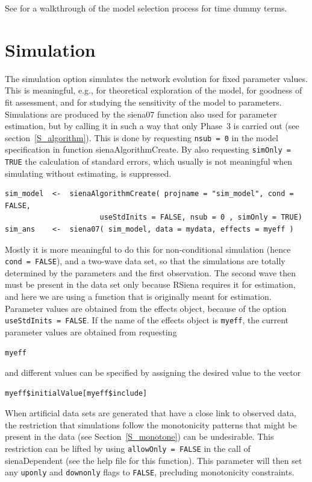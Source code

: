 \documentclass[a4paper,fleqn,11pt]{article}
\newcommand{\+}{\, + \,}
\newcommand{\sfn}[1]{\textsf{#1}}
\newcommand{\RS}{{\sf RSiena }}
\begin{document}
See \citet{Lospinoso2010b} for a walkthrough of the model selection process
for time dummy terms.


\newpage
\section{Simulation}
\label{S_sim}

The simulation option simulates the network evolution for fixed
parameter values. This is meaningful, e.g., for theoretical
exploration of the model, for goodness of fit assessment,
and for studying the sensitivity of the model to parameters.
Simulations are produced by the \textsf{siena07} function
also used for parameter estimation, but by calling it in
such a way that only Phase~3 is carried out
(see section~\ref{S_algorithm}).
This is done by requesting \texttt{nsub = 0} in
the model specification in function \textsf{sienaAlgorithmCreate}.
By also requesting \texttt{simOnly = TRUE} the calculation
of standard errors, which usually is not meaningful when
simulating without estimating, is suppressed.
\begin{verbatim}
sim_model  <-  sienaAlgorithmCreate( projname = "sim_model", cond = FALSE,
                      useStdInits = FALSE, nsub = 0 , simOnly = TRUE)
sim_ans    <-  siena07( sim_model, data = mydata, effects = myeff )
\end{verbatim}
Mostly it is more meaningful to do this for non-conditional simulation
(hence \texttt{cond = FALSE}), and a two-wave data set,
so that the simulations are totally determined
by the parameters and the first observation.
The second wave then must be present in the data set only
because \RS requires it for estimation,
and here we are using a function that is originally
meant for estimation.
Parameter values are obtained from the effects object,
because of the option \texttt{useStdInits = FALSE}.
If the name of the effects object is \texttt{myeff},
the current parameter values are obtained from requesting
\begin{verbatim}
myeff
\end{verbatim}
and different values can be specified by assigning the
desired value to the vector
\begin{verbatim}
myeff$initialValue[myeff$include]
\end{verbatim}

When artificial data sets are generated that have a close link to observed data,
the restriction that simulations follow the monotonicity patterns that
might be present in the data (see Section~\ref{S_monotone}) can be undesirable.
This restriction can be lifted by using \texttt{allowOnly = FALSE}
in the call of \sfn{sienaDependent} (see the help file for this function).
This parameter will then set any \texttt{uponly} and \texttt{downonly}
flags to \texttt{FALSE}, precluding monotonicity constraints.
\end{document}
